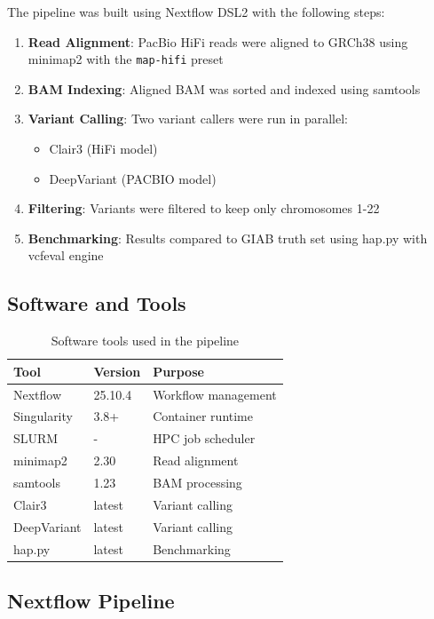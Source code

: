 \documentclass[12pt,a4paper]{article}
\begin{document}
The pipeline was built using Nextflow DSL2 with the following steps:

\begin{enumerate}
    \item \textbf{Read Alignment}: PacBio HiFi reads were aligned to GRCh38 using minimap2 with the \texttt{map-hifi} preset
    \item \textbf{BAM Indexing}: Aligned BAM was sorted and indexed using samtools
    \item \textbf{Variant Calling}: Two variant callers were run in parallel:
    \begin{itemize}
        \item Clair3 (HiFi model)
        \item DeepVariant (PACBIO model)
    \end{itemize}
    \item \textbf{Filtering}: Variants were filtered to keep only chromosomes 1-22
    \item \textbf{Benchmarking}: Results compared to GIAB truth set using hap.py with vcfeval engine
\end{enumerate}

\subsection{Software and Tools}

\begin{table}[h]
\centering
\begin{tabular}{@{}lll@{}}
\toprule
\textbf{Tool} & \textbf{Version} & \textbf{Purpose} \\
\midrule
Nextflow & 25.10.4 & Workflow management \\
Singularity & 3.8+ & Container runtime \\
SLURM & - & HPC job scheduler \\
minimap2 & 2.30 & Read alignment \\
samtools & 1.23 & BAM processing \\
Clair3 & latest & Variant calling \\
DeepVariant & latest & Variant calling \\
hap.py & latest & Benchmarking \\
\bottomrule
\end{tabular}
\caption{Software tools used in the pipeline}
\end{table}

\subsection{Nextflow Pipeline}
\end{document}
